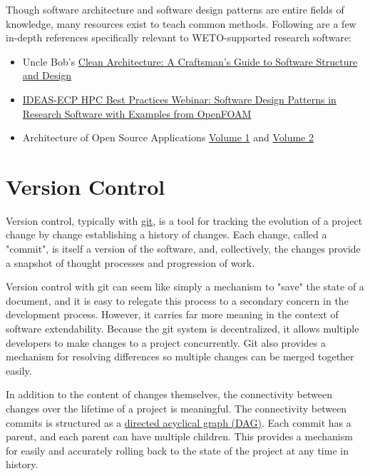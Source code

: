 \documentclass[]{nlr}
\begin{document}
Though software architecture and software design patterns are entire fields of knowledge,
many resources exist to teach common methods.
Following are a few in-depth references specifically relevant to WETO-supported research software:
\begin{itemize}    
\item Uncle Bob's \href{https://books.google.com/books/about/Clean_Architecture.html?id=uGE1DwAAQBAJ&source=kp_book_description}{Clean Architecture: A Craftsman's Guide to Software Structure and Design}
\item \href{https://www.youtube.com/watch?v=UWmkj-9SdAI}{IDEAS-ECP HPC Best Practices Webinar: Software Design Patterns in Research Software with Examples from OpenFOAM}
\item Architecture of Open Source Applications \href{https://aosabook.org/en/#aosa1}{Volume 1} and \href{https://aosabook.org/en/#aosa2}{Volume 2}
\end{itemize}


\section{Version Control}
\label{sec:version_control}

Version control, typically with \href{https://git-scm.com}{git}, is a tool for tracking the
evolution of a project change by change establishing a history of changes.
Each change, called a "commit", is itself a version of the software, and, collectively,
the changes provide a snapshot of thought processes and progression of work.

Version control with git can seem like simply a mechanism to "save" the state of a document,
and it is easy to relegate this process to a secondary concern in the development process.
However, it carries far more meaning in the context of software extendability.
Because the git system is decentralized, it allows multiple developers to make changes to a
project concurrently.
Git also provides a mechanism for resolving differences so multiple changes can be merged
together easily.

In addition to the content of changes themselves, the connectivity between changes over the
lifetime of a project is meaningful.
The connectivity between commits is structured as a
\href{https://en.wikipedia.org/wiki/Directed\_acyclic\_graph}{directed acyclical graph (DAG)}.
Each commit has a parent, and each parent can have multiple children.
This provides a mechanism for easily and accurately rolling back to the state of the project at any
time in history.
\end{document}
